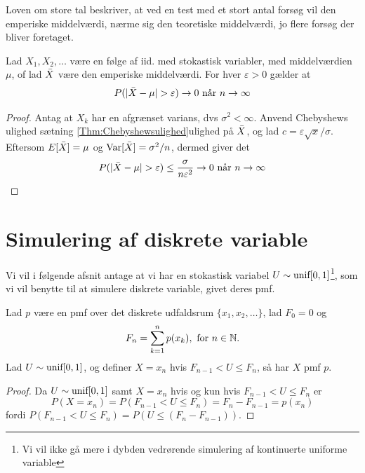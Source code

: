 Loven om store tal beskriver, at ved en test med et stort antal forsøg vil den emperiske middelværdi, nærme sig den teoretiske middelværdi, jo flere forsøg der bliver foretaget.
\begin{thm} \label{thm:law_of_large_numbers}%
    Lad $X_1, X_2, \dots$ være en følge af iid. med stokastisk variabler, med middelværdien $\mu$, of lad $\Bar{X}$ være den emperiske middelværdi. For hver $\varepsilon>0$ gælder at
    \begin{align*}
        P(|\Bar{X}-\mu|>\varepsilon) \rightarrow 0 \text{ når } n \rightarrow \infty
    \end{align*}
\end{thm}
\begin{proof}
    Antag at $X_k$ har en afgrænset varians, dvs $\sigma^2<\infty$. Anvend Chebyshews ulighed sætning \ref{Thm:Chebyshewsulighed}ulighed på $\Bar{X}$, og lad $c=\varepsilon \sqrt{x}/\sigma$. Eftersom $E[\Bar{X}]=\mu$ og $\textnormal{Var}[\Bar{X}]=\sigma^2/n$, dermed giver det
    \begin{align*}
        P(|\Bar{X}-\mu| > \varepsilon) \leq \frac{\sigma}{n\varepsilon^2} \rightarrow 0 \text{ når } n \rightarrow \infty
    \end{align*}
\end{proof}

\section{Simulering af diskrete variable} 
Vi vil i følgende afsnit antage at vi har en stokastisk variabel $U \sim \textnormal{unif}[0,1]$\footnote{Vi vil ikke gå mere i dybden vedrørende simulering af kontinuerte uniforme variable}, som vi vil benytte til at simulere diskrete variable, givet deres pmf.
\begin{thm} \label{thm:simuleringAfDiskreteVaraible}
    Lad $p$ være en pmf over det diskrete udfaldsrum $\{x_1, x_2, \ldots\}$, lad $F_0 = 0$ og
    \begin{equation*}
        F_n = \sum^n_{k = 1} p(x_k), \text{ for } n \in \mathbb{N}.
    \end{equation*}
    Lad $U \sim \textnormal{unif}[0, 1]$, og definer $X = x_n$ hvis $F_{n - 1} < U \leq F_n$, så har $X$ pmf $p$.
\end{thm}

\begin{proof}
    Da $U \sim \textnormal{unif}[0, 1]$ samt $X = x_n$ hvis og kun hvis $F_{n - 1} < U \leq F_n$ er
    \begin{equation*}
        P(X = x_n) = P(F_{n - 1} < U \leq F_n) = F_n - F_{n - 1} = p(x_n)
    \end{equation*}
    fordi $P(F_{n - 1} < U \leq F_n) = P\left(U \leq (F_n - F_{n - 1})\right)$.
\end{proof}

